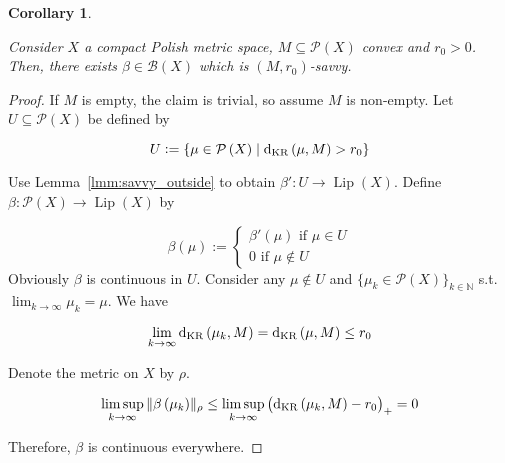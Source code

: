 \documentclass[11pt]{article}
\theoremstyle{definition}
\theoremstyle{plain}
\newtheorem{corollary}{Corollary}%
\newcommand{\Nats}{\mathbb{N}}
\newcommand{\N}[1]{\lVert #1 \rVert}
\newcommand{\Sq}[2]{\{#1\}_{#2 \in \Nats}}
\newcommand{\PM}{\mathcal{P}}
\newcommand{\Lp}{{\operatorname{Lip}}}
\newcommand{\DKR}{\operatorname{d}_{\textnormal{KR}}}
\newcommand{\Gm}{\mathcal{B}}
\begin{document}
\begin{samepage}
\begin{corollary}
\label{crl:savvy}

Consider $X$ a compact Polish metric space, $M \subseteq \PM\left(X\right)$ convex and $r_0 > 0$. Then, there exists $\beta \in \Gm\left(X\right)$ which is $\left(M,r_0\right)$-savvy.

\end{corollary}
\end{samepage}

\begin{proof}

If $M$ is empty, the claim is trivial, so assume $M$ is non-empty. Let $U \subseteq \PM\left(X\right)$ be defined by

$$U:=\{\mu \in \PM\left(X\right) \mid \DKR\left(\mu, M\right) > r_0\}$$

Use Lemma~\ref{lmm:savvy_outside} to obtain $\beta': U \rightarrow \Lp\left(X\right)$. Define $\beta: \PM\left(X\right) \rightarrow \Lp\left(X\right)$ by

$$\beta\left(\mu\right):=\begin{cases}\beta'\left(\mu\right) \text{ if } \mu \in U\\0 \text { if } \mu \not\in U\end{cases}$$ 
Obviously $\beta$ is continuous in $U$. Consider any $\mu \not\in U$ and $\Sq{\mu_k \in \PM\left(X\right)}{k}$ s.t. $\lim_{k \rightarrow \infty} \mu_k = \mu$. We have 

$$\lim_{k \rightarrow \infty} \DKR\left(\mu_k,M\right) = \DKR\left(\mu, M\right) \leq r_0$$

Denote the metric on $X$ by $\rho$. 

$$\limsup_{k \rightarrow \infty}{\N{\beta\left(\mu_k\right)}_\rho} \leq \limsup_{k \rightarrow \infty}{\left(\DKR\left(\mu_k,M\right) - r_0\right)_+} = 0$$

Therefore, $\beta$ is continuous everywhere.
\end{proof}
\end{document}
